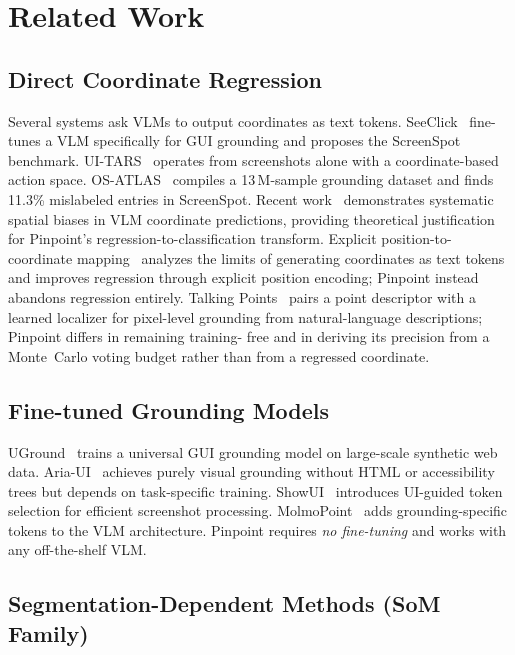 \documentclass[sigconf,nonacm]{acmart}
\begin{document}
\section{Related Work}
\label{sec:related-work}

\subsection{Direct Coordinate Regression}

Several systems ask VLMs to output coordinates as text tokens.
SeeClick~\cite{seeclick} fine-tunes a VLM specifically for GUI
grounding and proposes the ScreenSpot benchmark.
UI-TARS~\cite{uitars} operates from screenshots alone with a
coordinate-based action space.
OS-ATLAS~\cite{osatlas} compiles a 13\,M-sample grounding dataset
and finds 11.3\% mislabeled entries in ScreenSpot.
Recent work~\cite{localization-biases} demonstrates systematic spatial
biases in VLM coordinate predictions, providing theoretical
justification for Pinpoint's regression-to-classification transform.
Explicit position-to-coordinate mapping~\cite{pos2coord} analyzes the
limits of generating coordinates as text tokens and improves regression
through explicit position encoding; Pinpoint instead abandons
regression entirely.
Talking Points~\cite{rusanovsky2025talkingpoints} pairs a point
descriptor with a learned localizer for pixel-level grounding from
natural-language descriptions; Pinpoint differs in remaining training-
free and in deriving its precision from a Monte~Carlo voting budget
rather than from a regressed coordinate.

\subsection{Fine-tuned Grounding Models}

UGround~\cite{uground} trains a universal GUI grounding model on
large-scale synthetic web data.
Aria-UI~\cite{ariaui} achieves purely visual grounding without HTML or
accessibility trees but depends on task-specific training.
ShowUI~\cite{showui} introduces UI-guided token selection for
efficient screenshot processing.
MolmoPoint~\cite{molmopoint} adds grounding-specific tokens to the VLM
architecture.
Pinpoint requires \emph{no fine-tuning} and works with any off-the-shelf VLM.

\subsection{Segmentation-Dependent Methods (SoM Family)}
\end{document}
